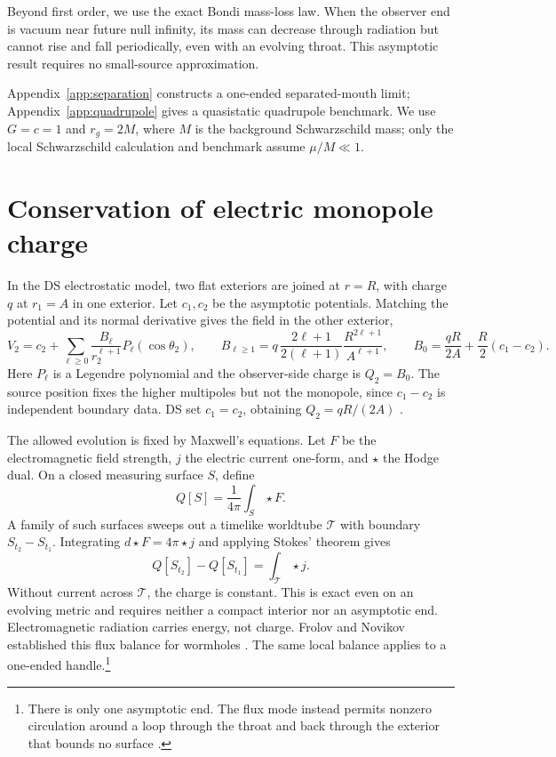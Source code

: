 \documentclass[aps,prd,10pt,onecolumn,nofootinbib,superscriptaddress,floatfix]{revtex4-2}
\begin{document}
Beyond first order, we use the exact Bondi mass-loss law.  When the observer
end is vacuum near future null infinity, its mass can decrease through
radiation but cannot rise and fall periodically, even with an evolving
throat.  This asymptotic result requires no small-source approximation.

Appendix~\ref{app:separation} constructs a one-ended separated-mouth limit;
Appendix~\ref{app:quadrupole} gives a quasistatic quadrupole benchmark.
We use $G=c=1$ and $r_g=2M$, where $M$ is the background Schwarzschild
mass; only the local Schwarzschild calculation and benchmark assume
$\mu/M\ll1$.

\section{Conservation of electric monopole charge}
\label{sec:maxwell}

In the DS electrostatic model, two flat exteriors are joined at $r=R$,
with charge $q$ at $r_1=A$ in one exterior.  Let $c_1,c_2$ be the
asymptotic potentials.  Matching the potential and its normal derivative
gives the field in the other exterior,
\begin{equation}
 V_2=c_2+\sum_{\ell\ge0}\frac{B_\ell}{r_2^{\ell+1}}
 P_\ell(\cos\theta_2),\qquad
 B_{\ell\ge1}=q\,\frac{2\ell+1}{2(\ell+1)}
 \frac{R^{2\ell+1}}{A^{\ell+1}},\qquad
 B_0=\frac{qR}{2A}+\frac{R}{2}(c_1-c_2).
 \label{eq:ds-multipoles}
\end{equation}
Here $P_\ell$ is a Legendre polynomial and the observer-side charge is
$Q_2=B_0$.  The source position fixes the higher multipoles but not the
monopole, since $c_1-c_2$ is independent boundary data.
DS set $c_1=c_2$, obtaining $Q_2=qR/(2A)$
\cite{DaiStojkovic2019Observing}.

The allowed evolution is fixed by Maxwell's equations.
Let $F$ be the electromagnetic field strength, $j$ the electric current
one-form, and $\star$ the Hodge dual.  On a closed measuring surface $S$,
define
\begin{equation}
 Q[S]=\frac{1}{4\pi}\int_S\star F.
 \label{eq:maxwell-charge}
\end{equation}
A family of such surfaces sweeps out a timelike worldtube $\mathcal T$
with boundary $S_{t_2}-S_{t_1}$.  Integrating $d\star F=4\pi\star j$
and applying Stokes' theorem gives
\begin{equation}
 Q[S_{t_2}]-Q[S_{t_1}]=\int_{\mathcal T}\star j.
 \label{eq:maxwell-balance}
\end{equation}
Without current across $\mathcal T$, the charge is constant.
This is exact even on an evolving metric and requires neither a compact
interior nor an asymptotic end.  Electromagnetic radiation carries
energy, not charge.  Frolov and Novikov established this flux balance
for wormholes \cite{FrolovNovikov1990PhysicalEffects}.
The same local balance applies to a one-ended handle.\footnote{There is
only one asymptotic end.  The flux mode instead permits nonzero circulation
around a loop through the throat and back through the exterior that bounds
no surface \cite{FrolovNovikov1990PhysicalEffects}.}
\end{document}
